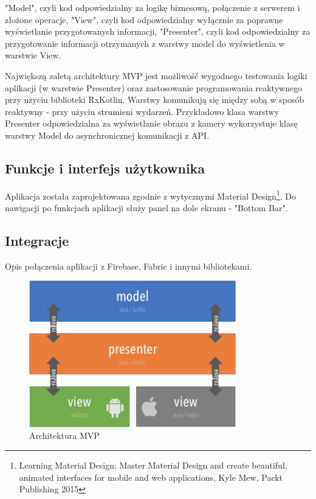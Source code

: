 \newline
\textbullet \space "Model", czyli kod odpowiedzialny za logikę biznesową, połączenie z serwerem i złożone operacje,\newline
\textbullet \space "View", czyli kod odpowiedzialny wyłącznie za poprawne wyświetlanie przygotowanych informacji,\newline
\textbullet \space "Presenter", czyli kod odpowiedzialny za przygotowanie informacji otrzymanych z warstwy model do wyświetlenia w warstwie View.\newline

\newline Największą zaletą architektury MVP jest możliwość wygodnego testowania logiki aplikacji (w warstwie Presenter) oraz zastosowanie programowania reaktywnego przy użyciu biblioteki RxKotlin.
Warstwy komunikują się między sobą w sposób reaktywny - przy użyciu strumieni wydarzeń. Przykładowo klasa warstwy Presenter odpowiedzialna za wyświetlanie obrazu z kamery wykorzystuje klasę warstwy Model do asynchronicznej komunikacji z API.

\subsection*{Funkcje i interfejs użytkownika}
Aplikacja została zaprojektowana zgodnie z wytycznymi Material Design\footnote{Learning Material Design: Master Material Design and create beautiful, animated interfaces for mobile and web applications, Kyle Mew, Packt Publishing 2015}.
Do nawigacji po funkcjach aplikacji służy panel na dole ekranu - "Bottom Bar".

\subsection*{Integracje}
Opis połączenia aplikacji z Firebase, Fabric i innymi bibliotekami.

\begin{figure}[ht]
    \centering
    \includegraphics[width=9cm]{android_architecture}
    \caption{Architektura MVP}
\end{figure}

